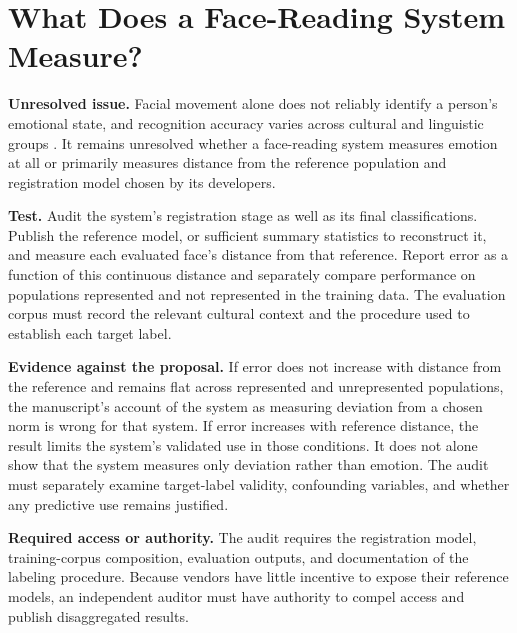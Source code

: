 \section{What Does a Face-Reading System Measure?}
\label{sec:11.9}

\textbf{Unresolved issue.}
Facial movement alone does not reliably identify a person's emotional state, and recognition accuracy varies across cultural and linguistic groups \autocite{barrett2019emotional,elfenbein2002universality}. It remains unresolved whether a face-reading system measures emotion at all or primarily measures distance from the reference population and registration model chosen by its developers.

\textbf{Test.}
Audit the system's registration stage as well as its final classifications. Publish the reference model, or sufficient summary statistics to reconstruct it, and measure each evaluated face's distance from that reference. Report error as a function of this continuous distance and separately compare performance on populations represented and not represented in the training data. The evaluation corpus must record the relevant cultural context and the procedure used to establish each target label.

\textbf{Evidence against the proposal.}
If error does not increase with distance from the reference and remains flat across represented and unrepresented populations, the manuscript's account of the system as measuring deviation from a chosen norm is wrong for that system. If error increases with reference distance, the result limits the system's validated use in those conditions. It does not alone show that the system measures only deviation rather than emotion. The audit must separately examine target-label validity, confounding variables, and whether any predictive use remains justified.

\textbf{Required access or authority.}
The audit requires the registration model, training-corpus composition, evaluation outputs, and documentation of the labeling procedure. Because vendors have little incentive to expose their reference models, an independent auditor must have authority to compel access and publish disaggregated results.
